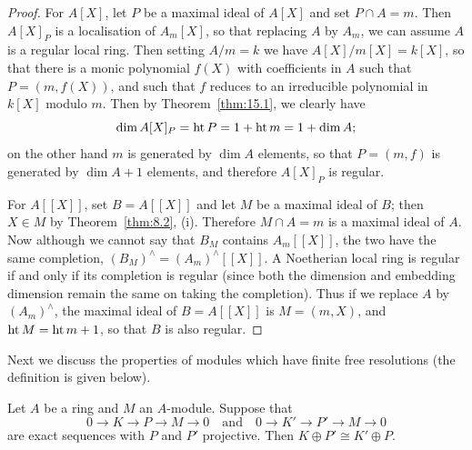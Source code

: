 \begin{proof}
For $A[X]$, let $P$ be a maximal ideal of $A[X]$ and set $P \cap A = m$.
Then $A[X]_P$ is a localisation of $A_m[X]$, so that replacing $A$ by $A_m$, we can assume
$A$ is a regular local ring. Then setting $A/m = k$ we have $A[X]/m[X] =
k[X]$, so that there is a monic polynomial $f(X)$ with coefficients in $A$ such that
$P = (m, f(X))$, and such that $f$ reduces to an irreducible polynomial in
$k[X]$ modulo $m$. Then by Theorem~\ref{thm:15.1}, we clearly have
\[
  \dim A[X]_P = \operatorname{ht} P = 1 + \operatorname{ht} m = 1 + \dim A;
\]
on the other hand $m$ is generated by $\dim A$ elements, so that $P = (m, f)$ is
generated by $\dim A + 1$ elements, and therefore $A[X]_P$ is regular.

For $A[[X]]$, set $B = A[[X]]$ and let $M$ be a maximal ideal of $B$; then $X \in M$
by Theorem~\ref{thm:8.2}, (i). Therefore $M \cap A = m$ is a maximal ideal of $A$. Now
although we cannot say that $B_M$ contains $A_m[[X]]$, the two have the same
completion, $(B_M)^\wedge = (A_m)^\wedge[[X]]$. A Noetherian local ring is regular if and
only if its completion is regular (since both the dimension and embedding
dimension remain the same on taking the completion). Thus if we replace
$A$ by $(A_m)^\wedge$, the maximal ideal of $B = A[[X]]$ is $M = (m, X)$, and $\operatorname{ht} M =
\operatorname{ht} m + 1$, so that $B$ is also regular.
\end{proof}

Next we discuss the properties of modules which have finite free
resolutions (the definition is given below).

\begin{lemma}[Schanuel]\label{lem:19.3}
Let $A$ be a ring and $M$ an $A$-module. Suppose that
\[
  0 \to K \to P \to M \to 0 \quad \text{and} \quad 0 \to K' \to P' \to M \to 0
\]
are exact sequences with $P$ and $P'$ projective. Then $K \oplus P' \cong K' \oplus P$.
\end{lemma}

